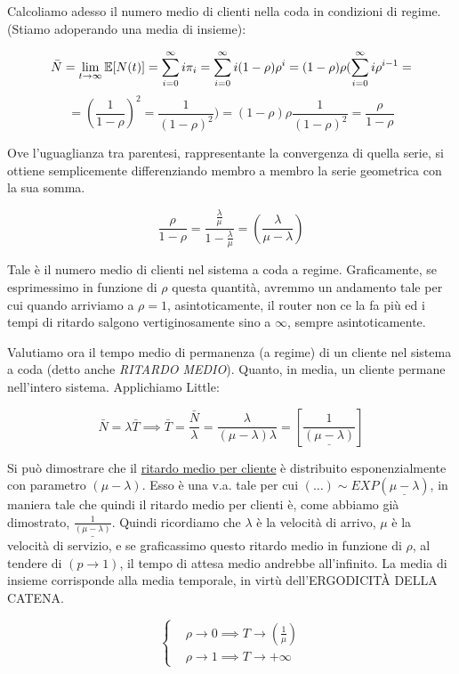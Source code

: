 Calcoliamo adesso il numero medio di clienti nella coda in condizioni di regime. (Stiamo adoperando una media di insieme):

\[
	\bar{N} = \lim_{t\to\infty}{\operatorname{\mathbb{E}}[N(t)]} = \sum_{i=0}^\infty{i\pi_i} = \sum_{i=0}^\infty{i(1-\rho)\rho^i} = (1-\rho)\rho(\sum_{i=0}^\infty{i\rho^{i-1}} =
\]
\[
	= (\frac{1}{1-\rho})^2 = \frac{1}{(1-\rho)^2}) = (1-\rho)\rho\frac{1}{(1-\rho)^2} = \frac{\rho}{1-\rho}
\]

Ove l'uguaglianza tra parentesi, rappresentante la convergenza di quella serie, si ottiene semplicemente differenziando membro a membro la serie geometrica con la sua somma.

\[
	\frac{\rho}{1-\rho} = \frac{\frac{\lambda}{\mu}}{1-\frac{\lambda}{\mu}} = (\frac{\lambda}{\mu-\lambda})
\]

Tale è il numero medio di clienti nel sistema a coda a regime. Graficamente, se esprimessimo in funzione di $\rho$ questa quantità, avremmo un andamento tale per cui quando arriviamo a $\rho=1$, asintoticamente, il router non ce la fa più ed i tempi di ritardo salgono vertiginosamente sino a $\infty$, sempre asintoticamente.

Valutiamo ora il tempo medio di permanenza (a regime) di un cliente nel sistema a coda (detto anche \textit{RITARDO MEDIO}). Quanto, in media, un cliente permane nell'intero sistema. Applichiamo Little:

\[
	\bar{N} = \lambda\bar{T} \implies \bar{T} = \frac{\bar{N}}{\lambda} = \frac{\lambda}{(\mu-\lambda)\lambda} = [\underline{\frac{1}{(\mu-\lambda)}}]
\]

Si può dimostrare che il \underline{ritardo medio per cliente} è distribuito esponenzialmente con parametro $(\mu-\lambda)$. Esso è una v.a. tale per cui $(\dots) \sim EXP(\underline{\mu-\lambda})$, in maniera tale che quindi il ritardo medio per clienti è, come abbiamo già dimostrato, $\underline{\frac{1}{(\mu-\lambda)}}$. Quindi ricordiamo che $\lambda$ è la velocità di arrivo, $\mu$ è la velocità di servizio, e se graficassimo questo ritardo medio in funzione di $\rho$, al tendere di $(p\to 1)$, il tempo di attesa medio andrebbe all'infinito. La media di insieme corrisponde alla media temporale, in virtù dell'ERGODICIT\`A DELLA CATENA.

\[
	\left\{
	\begin{aligned}
	&\rho\to 0 \implies T \to (\frac{1}{\mu})\\
	&\rho\to 1 \implies T \to +\infty
	\end{aligned}
	\right.
\]


